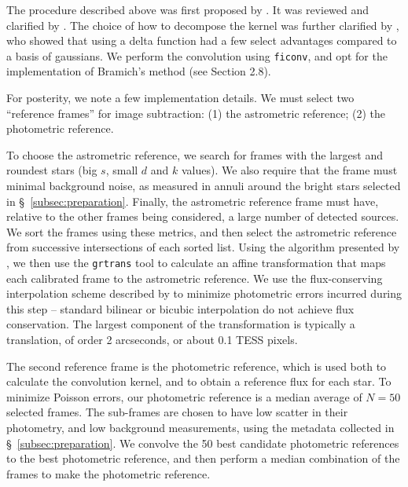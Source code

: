 \documentclass[12pt,twocolumn,tighten]{aastex62}
\begin{document}
The procedure described above was first proposed by \citet{Alard_Lupton_1998}.
It was reviewed and clarified by \citet{miller_optimal_2008}.
The choice of how to decompose the kernel was further clarified by
\citet{bramich_new_2008}, who showed that using a delta function
had a few select advantages compared to a basis of gaussians.
We perform the convolution using \texttt{ficonv}, and opt for
the implementation of Bramich's method (see \citealt{Pal_2009} Section 2.8).

For posterity, we note a few implementation details.
We must select two ``reference frames'' for image subtraction:
(1) the astrometric reference; (2) the photometric reference.

To choose the astrometric reference, we search for frames with
the largest and roundest stars (big $s$, small $d$ and $k$ values).
We also require
that the frame must minimal background noise, as measured in annuli
around the bright stars selected in \S~\ref{subsec:preparation}.
Finally, the astrometric reference frame must have, relative to the 
other frames being
considered, a large number of detected sources.
We sort the frames using these metrics, and then select the
astrometric reference from successive intersections of each sorted
list.
Using the algorithm presented by \citet{pal_astrometry_2006}, we then
use the \texttt{grtrans} tool to
calculate an affine transformation that maps each calibrated frame
to the astrometric reference.
We use the flux-conserving interpolation
scheme described by \citet{Pal_2009} to minimize photometric errors
incurred during this step --
standard bilinear or bicubic interpolation do not achieve flux
conservation.  
The largest component of the transformation is typically a translation,
of order 2 arcseconds, or about 0.1 TESS pixels.

The second reference frame is the
photometric reference, which is used both to calculate the
convolution kernel, and to obtain a
reference flux for each star.  
To minimize Poisson errors, our photometric reference is a median average of
$N=50$ selected frames.
The sub-frames are chosen to have low scatter in their photometry,
and low background measurements, using the metadata collected
in \S~\ref{subsec:preparation}.
We convolve the 50 best candidate photometric references to the best
photometric reference, and then perform a median combination of the
frames to make the photometric reference.

\end{document}
